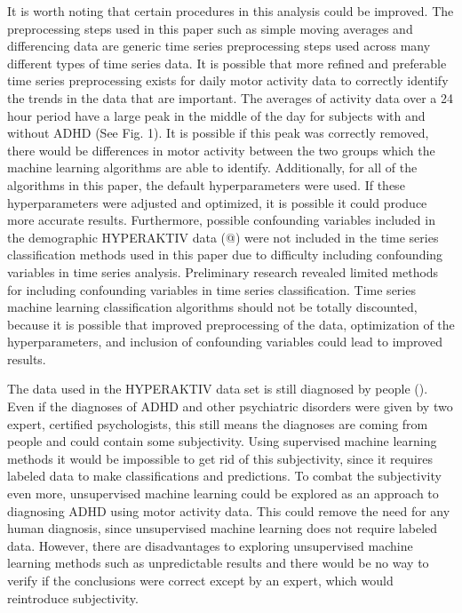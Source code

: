 \documentclass[,article,,moreauthors,pdftex]{mdpi}
\begin{document}
It is worth noting that certain procedures in this analysis could be
improved. The preprocessing steps used in this paper such as simple
moving averages and differencing data are generic time series
preprocessing steps used across many different types of time series
data. It is possible that more refined and preferable time series
preprocessing exists for daily motor activity data to correctly identify
the trends in the data that are important. The averages of activity data
over a 24 hour period have a large peak in the middle of the day for
subjects with and without ADHD (See Fig. 1). It is possible if this peak
was correctly removed, there would be differences in motor activity
between the two groups which the machine learning algorithms are able to
identify. Additionally, for all of the algorithms in this paper, the
default hyperparameters were used. If these hyperparameters were
adjusted and optimized, it is possible it could produce more accurate
results. Furthermore, possible confounding variables included in the
demographic HYPERAKTIV data (@) were not included in the time series
classification methods used in this paper due to difficulty including
confounding variables in time series analysis. Preliminary research
revealed limited methods for including confounding variables in time
series classification. Time series machine learning classification
algorithms should not be totally discounted, because it is possible that
improved preprocessing of the data, optimization of the hyperparameters,
and inclusion of confounding variables could lead to improved results.

The data used in the HYPERAKTIV data set is still diagnosed by people
(\citet{10.1145/3458305.3478454}). Even if the diagnoses of ADHD and
other psychiatric disorders were given by two expert, certified
psychologists, this still means the diagnoses are coming from people and
could contain some subjectivity. Using supervised machine learning
methods it would be impossible to get rid of this subjectivity, since it
requires labeled data to make classifications and predictions. To combat
the subjectivity even more, unsupervised machine learning could be
explored as an approach to diagnosing ADHD using motor activity data.
This could remove the need for any human diagnosis, since unsupervised
machine learning does not require labeled data. However, there are
disadvantages to exploring unsupervised machine learning methods such as
unpredictable results and there would be no way to verify if the
conclusions were correct except by an expert, which would reintroduce
subjectivity.
\end{document}

